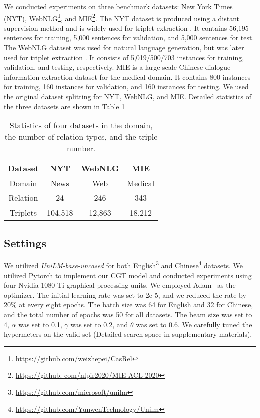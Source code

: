 \documentclass[letterpaper]{article} \usepackage{aaai21}  \usepackage{times}  \usepackage{helvet} \usepackage{courier}  \usepackage[hyphens]{url}  \usepackage{graphicx} \urlstyle{rm} \def\UrlFont{\rm}  \usepackage{natbib}  \usepackage[noend]{algpseudocode}
\begin{document}
We conducted experiments on three benchmark datasets: New York Times (NYT), WebNLG\footnote{\url{https://github.com/weizhepei/CasRel}}, and MIE\footnote{\url{https://github. com/nlpir2020/MIE-ACL-2020}}. The NYT dataset is produced using a distant supervision method and is widely used for triplet extraction \cite{riedel2010modeling}.  It contains 56,195 sentences for training, 5,000 sentences for validation, and 5,000 sentences for test. The WebNLG dataset \cite{gardent2017creating} was used for natural language generation, but was later used for triplet extraction \cite{zeng2018extracting}. It consists of 5,019/500/703 instances for training, validation, and testing, respectively. MIE \cite{zhang2020mie} is a large-scale Chinese dialogue information extraction dataset for the medical domain. It contains 800 instances for training, 160 instances for validation, and 160 instances for testing. We used the original dataset splitting for NYT, WebNLG, and MIE. Detailed statistics of the three datasets are shown in Table \ref{dataset}
\begin{table}[!htbp]
 
\centering
{
\begin{tabular}{c|ccc}

\toprule
Dataset&NYT&WebNLG&MIE\\
\midrule
Domain&News&Web&Medical\\
Relation&24&246&343\\
Triplets&104,518&12,863&18,212\\
\bottomrule
\end{tabular}
}
\caption{Statistics of four datasets in the domain, the number of relation types, and the triple number.}
\label{dataset}
\end{table}

\subsection{Settings}
We utilized \emph{UniLM-base-uncased} for both English\footnote{\url{https://github.com/microsoft/unilm}} and Chinese\footnote{\url{https://github.com/YunwenTechnology/Unilm}} datasets. We utilized Pytorch  to implement our CGT model and conducted experiments using four Nvidia 1080-Ti graphical processing units. We employed Adam~\cite{kingma2014adam} as the optimizer. The initial learning rate was set to 2e-5, and we reduced the rate by 20\% at every eight epochs. The batch size was 64 for English and 32 for Chinese, and the total number of epochs was 50 for all datasets. The beam size was set to 4, $\alpha$ was set to 0.1,  $\gamma$ was set to 0.2, and $\theta$ was set to 0.6. We carefully tuned the hypermeters on the valid set (Detailed search space in supplementary materials). 
\end{document}
